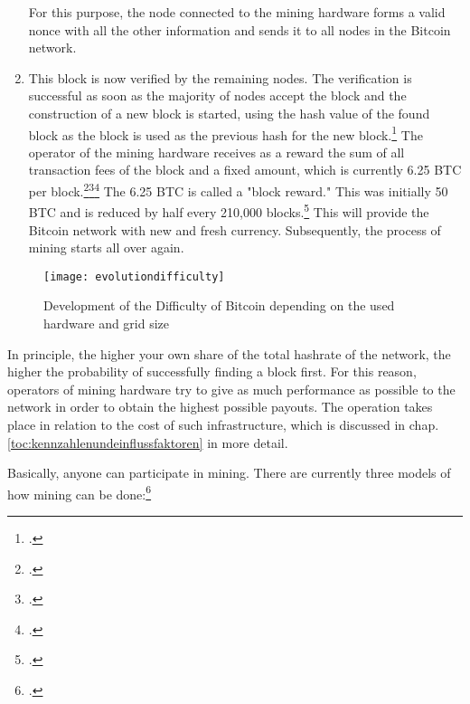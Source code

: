 \begin{enumerate}
    For this purpose, the node connected to the mining hardware forms a
    valid nonce with all the other information and sends it to all nodes in the Bitcoin network.
    \item This block is now verified by the remaining nodes. The verification is successful as soon as the majority of
    nodes accept the block and the construction of a new block is started, using the hash value of the found block as the
    block is used as the previous hash for the new block.\footcite[Cf.][pp. 3]{nakamoto2008bitcoin}
    The operator of the mining hardware receives as a reward the sum of all transaction fees of the block and
    a fixed amount, which is currently 6.25 \ac{BTC} per block.\footcite[Cf.][p. 4]{nakamoto2008bitcoin}\footcite[Cf.][]{btcecho2021halving}\footcite[Cf.][p. 59]{taylor2017evolution}
    The 6.25 \ac{BTC} is called a "block reward." This was initially 50 \ac{BTC} and is reduced by half every 210,000 blocks.\footcite[Cf.][p. 58]{taylor2017evolution}
    This will provide the Bitcoin network with new and
    fresh currency. Subsequently, the process of mining starts all over again.
\end{enumerate}

\begin{figure}[H]
    \caption{Development of the Difficulty of Bitcoin depending on the used hardware and grid size}
    \texttt{[image: evolutiondifficulty]}
    \label{figure:evolutiondifficulty}
    \\
    \cite[Source: ][Fig. 1b]{taylor2017evolution}
\end{figure}

In principle, the higher your own share of the total hashrate of the network, the higher the probability of successfully finding a block first.
For this reason, operators of mining hardware try to give as much
performance as possible to the network in order to obtain the highest possible payouts. The operation
takes place in relation to the cost of such infrastructure, which is discussed in chap.
\ref{toc:kennzahlenundeinflussfaktoren} in more detail.

Basically, anyone can participate in mining. There are currently three models of how mining can be
done:\footcite[Cf.][p. 53, pp. 57]{bhaskar2015bitcoin}

